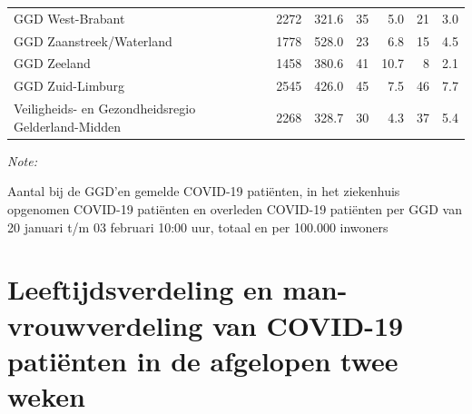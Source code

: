 \documentclass[
  english,
  man,floatsintext]{apa6}
\begin{document}
\begin{table}[H]
\begin{threeparttable}
\begin{tabular}{lrrrrrr}
GGD West-Brabant & 2272 & 321.6 & 35 & 5.0 & 21 & 3.0\\
GGD Zaanstreek/Waterland & 1778 & 528.0 & 23 & 6.8 & 15 & 4.5\\
GGD Zeeland & 1458 & 380.6 & 41 & 10.7 & 8 & 2.1\\
GGD Zuid-Limburg & 2545 & 426.0 & 45 & 7.5 & 46 & 7.7\\
Veiligheids- en Gezondheidsregio Gelderland-Midden & 2268 & 328.7 & 30 & 4.3 & 37 & 5.4\\
\bottomrule
\end{tabular}
\begin{tablenotes}
\item \textit{Note: } 
\item Aantal bij de GGD’en gemelde COVID-19 patiënten, in het ziekenhuis opgenomen COVID-19 patiënten en overleden COVID-19 patiënten per GGD van 20 januari t/m 03 februari 10:00 uur, totaal en per 100.000 inwoners
\end{tablenotes}
\end{threeparttable}
\endgroup{}
\end{table}

\newpage

\hypertarget{leeftijdsverdeling-en-man-vrouwverdeling-van-covid-19-patiuxebnten-in-de-afgelopen-twee-weken}{%
\section{Leeftijdsverdeling en man-vrouwverdeling van COVID-19 patiënten in de afgelopen twee weken}\label{leeftijdsverdeling-en-man-vrouwverdeling-van-covid-19-patiuxebnten-in-de-afgelopen-twee-weken}}
\end{document}
